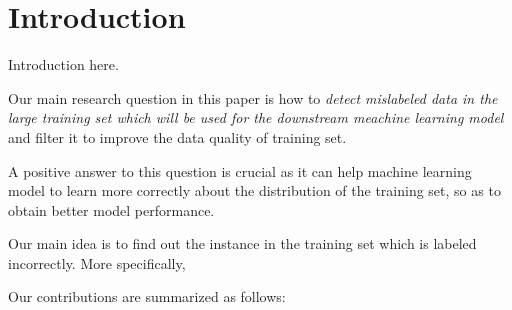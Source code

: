 \section{Introduction} 
\label{sec:intro}
Introduction here.

Our main research question in this paper is how to \textit{detect mislabeled data in the large training set which will be used for the downstream meachine learning model} and filter it to improve the data quality of training set.

A positive answer to this question is crucial as it can help machine learning model to learn more correctly about the distribution of the training set, so as to obtain better model performance.




Our main idea is to find out the instance in the training set which is labeled incorrectly.
More specifically, 

Our contributions are summarized as follows:

\be
	\item 
	\item 
	\item {}
\ee



